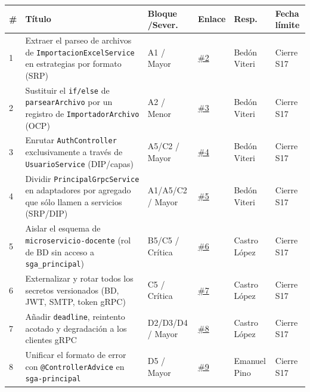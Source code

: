 \documentclass[11pt,a4paper]{article}
\begin{document}
{\small
\begin{xltabular}{\textwidth}{@{}p{0.5cm}Xp{1.9cm}p{1.7cm}p{1.7cm}p{1.9cm}@{}}
\toprule
\textbf{\#} & \textbf{T\'itulo} & \textbf{Bloque /Sever.} & \textbf{Enlace} & \textbf{Resp.} & \textbf{Fecha l\'imite} \\
\midrule
{} & Extraer el parseo de archivos de \texttt{ImportacionExcelService} en estrategias por formato (SRP) & A1 / Mayor & \raggedright\scriptsize\href{https://github.com/LEO23as/sga-sistema-distribuido/issues/2}{\#2} & \scriptsize Bed\'on Viteri & \scriptsize Cierre S17 \\
2 & Sustituir el \texttt{if/else} de \texttt{parsearArchivo} por un registro de \texttt{ImportadorArchivo} (OCP) & A2 / Menor & \raggedright\scriptsize\href{https://github.com/LEO23as/sga-sistema-distribuido/issues/3}{\#3} & \scriptsize Bed\'on Viteri & \scriptsize Cierre S17 \\
3 & Enrutar \texttt{AuthController} exclusivamente a trav\'es de \texttt{UsuarioService} (DIP/capas) & A5/C2 / Mayor & \raggedright\scriptsize\href{https://github.com/LEO23as/sga-sistema-distribuido/issues/4}{\#4} & \scriptsize Bed\'on Viteri & \scriptsize Cierre S17 \\
4 & Dividir \texttt{PrincipalGrpcService} en adaptadores por agregado que s\'olo llamen a servicios (SRP/DIP) & A1/A5/C2 / Mayor & \raggedright\scriptsize\href{https://github.com/LEO23as/sga-sistema-distribuido/issues/5}{\#5} & \scriptsize Bed\'on Viteri & \scriptsize Cierre S17 \\
5 & Aislar el esquema de \texttt{microservicio-docente} (rol de BD sin acceso a \texttt{sga\_principal}) & B5/C5 / Cr\'itica & \raggedright\scriptsize\href{https://github.com/LEO23as/sga-sistema-distribuido/issues/6}{\#6} & \scriptsize Castro L\'opez & \scriptsize Cierre S17 \\
6 & Externalizar y rotar todos los secretos versionados (BD, JWT, SMTP, token gRPC) & C5 / Cr\'itica & \raggedright\scriptsize\href{https://github.com/LEO23as/sga-sistema-distribuido/issues/7}{\#7} & \scriptsize Castro L\'opez & \scriptsize Cierre S17 \\
7 & A\~nadir \texttt{deadline}, reintento acotado y degradaci\'on a los clientes gRPC & D2/D3/D4 / Mayor & \raggedright\scriptsize\href{https://github.com/LEO23as/sga-sistema-distribuido/issues/8}{\#8} & \scriptsize Castro L\'opez & \scriptsize Cierre S17 \\
8 & Unificar el formato de error con \texttt{@ControllerAdvice} en \texttt{sga-principal} & D5 / Mayor & \raggedright\scriptsize\href{https://github.com/LEO23as/sga-sistema-distribuido/issues/9}{\#9} & \scriptsize Emanuel Pino & \scriptsize Cierre S17 \\

\end{xltabular}}
\end{document}
